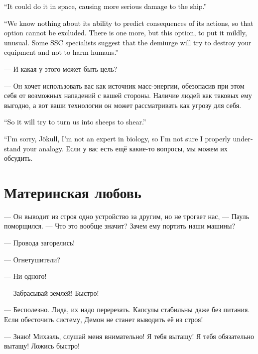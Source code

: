 \documentclass[a4paper,12pt,fleqn]{book}\usepackage{cooltooltips}\usepackage{polyglossia}\setdefaultlanguage[babelshorthands=true]{russian}\setotherlanguage{english}\defaultfontfeatures{Ligatures=TeX,Mapping=tex-text} \usepackage{xcolor}\definecolor{lightgray}{HTML}{bbbbbb}\color{lightgray}\newcommand{\ml}[3]{\textenglish{\textcolor{black}{#3}}}
\newcommand{\asterism}{\vspace{1em}{\centering\Large\bfseries$\ast~\ast~\ast$\par}\vspace{1em}}
\begin{document}
\ml{$0$}
{--- Он мог уничтожить нас ещё в космосе, нанеся кораблю более значимые повреждения.}
{``It could do it in space, causing more serious damage to the ship.''}

\ml{$0$}
{--- Мы не знаем о том, насколько он способен предсказывать последствия своих действий, поэтому этот вариант исключать нельзя.}
{``We know nothing about its ability to predict consequences of its actions, so that option cannot be excluded.}
\ml{$0$}
{Есть ещё третий вариант, но он, мягко говоря, необычный.}
{There is one more, but this option, to put it mildly, unusual.}
\ml{$0$}
{Некоторые специалисты СБ предполагают, что демиург попытается уничтожить вашу технику, стараясь не причинить вреда людям.}
{Some SSC specialists suggest that the demiurge will try to destroy your equipment and not to harm humans.''}

--- И какая у этого может быть цель?

--- Он хочет использовать вас как источник масс-энергии, обезопасив при этом себя от возможных нападений с вашей стороны.
Наличие людей как таковых ему выгодно, а вот ваши технологии он может рассматривать как угрозу для себя.

\ml{$0$}
{--- То есть из нас делают овечек и собираются стричь.}
{``So it will try to turn us into sheeps to shear.''}

\ml{$0$}
{--- Простите, Йокудль, я не специалист в биологии и не вполне понимаю вашу аналогию.}
{``I'm sorry, Jökull, I'm not an expert in biology, so I'm not sure I properly understand your analogy.}
Если у вас есть ещё какие-то вопросы, мы можем их обсудить.

\section{Материнская любовь}

--- Он выводит из строя одно устройство за другим, но не трогает нас, --- Пауль поморщился.
--- Что это вообще значит?
Зачем ему портить наши машины?

\asterism

--- Провода загорелись!

--- Огнетушители?

--- Ни одного!

--- Забрасывай землёй!
Быстро!

--- Бесполезно.
Лида, их надо перерезать.
Капсулы стабильны даже без питания.
Если обесточить систему, Демон не станет выводить её из строя!

--- Знаю!
Михаэль, слушай меня внимательно!
Я тебя вытащу!
Я тебя обязательно вытащу!
Ложись быстро!
\end{document}

